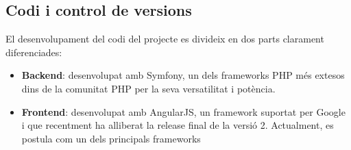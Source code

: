 \subsection{Codi i control de versions}

El desenvolupament del codi del projecte es divideix en dos parts clarament diferenciades:
\begin{itemize}
	\item \textbf{Backend}: desenvolupat amb Symfony, un dels frameworks PHP més extesos dins de la comunitat PHP per la seva versatilitat i potència.
	\item \textbf{Frontend}: desenvolupat amb AngularJS, un framework suportat per Google i  que recentment ha alliberat la release final de la versió 2. Actualment, es postula com un dels principals frameworks 
\end{itemize}

